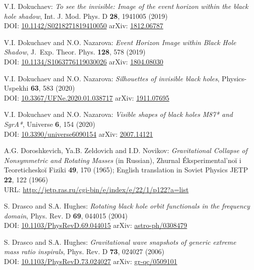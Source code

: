 \begin{thebibliography}{123}
V.I. Dokuchaev: {\em To see the invisible: Image of the event horizon within the black hole shadow},
Int. J. Mod. Phys. D {\bf 28}, 1941005 (2019)\\
DOI: \href{https://doi.org/10.1142/S0218271819410050}{10.1142/S0218271819410050}\hfill
arXiv: \href{https://arxiv.org/abs/1812.06787}{1812.06787}

V.I. Dokuchaev and N.O. Nazarova: {\em Event Horizon Image within Black Hole Shadow},
J.~Exp. Theor. Phys. {\bf 128}, 578 (2019)\\
DOI: \href{https://doi.org/10.1134/S1063776119030026}{10.1134/S1063776119030026}\hfill
arXiv: \href{https://arxiv.org/abs/1804.08030}{1804.08030}

V.I. Dokuchaev and N.O. Nazarova: {\em Silhouettes of invisible black holes},
Physics-Uspekhi {\bf 63}, 583 (2020)\\
DOI: \href{https://doi.org/10.3367/UFNe.2020.01.038717}{10.3367/UFNe.2020.01.038717}\hfill
arXiv: \href{https://arxiv.org/abs/1911.07695}{1911.07695}

V.I. Dokuchaev and N.O. Nazarova: {\em Visible shapes of black holes M87* and SgrA*},
Universe {\bf 6}, 154 (2020)\\
DOI: \href{https://doi.org/10.3390/universe6090154}{10.3390/universe6090154}\hfill
arXiv: \href{https://arxiv.org/abs/2007.14121}{2007.14121}

A.G. Doroshkevich, Ya.B. Zeldovich and I.D. Novikov:
{\em Gravitational Collapse of Nonsymmetric and Rotating Masses} (in Russian),
Zhurnal Éksperimental'noĭ i Teoreticheskoĭ Fiziki {\bf 49}, 170 (1965);
English translation in Soviet Physics JETP {\bf 22}, 122 (1966)\\
URL: \url{http://jetp.ras.ru/cgi-bin/e/index/e/22/1/p122?a=list}

S. Drasco and S.A. Hughes:
{\em Rotating black hole orbit functionals in the frequency domain},
Phys. Rev. D {\bf 69}, 044015 (2004)\\
DOI: \href{https://doi.org/10.1103/PhysRevD.69.044015}{10.1103/PhysRevD.69.044015}\hfill
arXiv: \href{https://arxiv.org/abs/astro-ph/0308479}{astro-ph/0308479}

S. Drasco and S.A. Hughes:
{\em Gravitational wave snapshots of generic extreme mass ratio inspirals},
Phys. Rev. D {\bf 73}, 024027 (2006)\\
DOI: \href{https://doi.org/10.1103/PhysRevD.73.024027}{10.1103/PhysRevD.73.024027}\hfill
arXiv: \href{https://arxiv.org/abs/gr-qc/0509101}{gr-qc/0509101}


\end{thebibliography}
